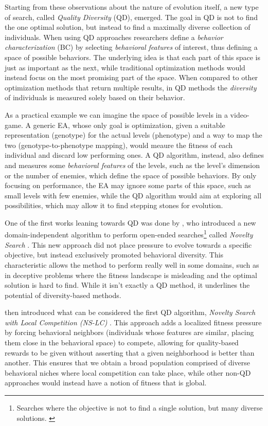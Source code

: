 \documentclass{Configuration_Files/PoliMi3i_thesis}
\begin{document}
Starting from these observations about the nature of evolution itself, a new type of search, called \textit{Quality Diversity} (QD), emerged. The goal in QD is not to find the one optimal solution, but instead to find a maximally diverse collection of individuals. When using QD approaches researchers define a \textit{behavior characterization} (BC) by selecting \textit{behavioral features} of interest, thus defining a space of possible behaviors. The underlying idea is that each part of this space is just as important as the next, while traditional optimization methods would instead focus on the most promising part of the space. When compared to other optimization methods that return multiple results, in QD methods the \textit{diversity} of individuals is measured solely based on their behavior. \cite{pugh_quality_2016}  

As a practical example we can imagine the space of possible levels in a video-game. A generic EA, whose only goal is optimization, given a suitable representation (genotype) for the actual levels (phenotype) and a way to map the two (genotype-to-phenotype mapping), would meaure the fitness of each individual and discard low performing ones. A QD algorithm, instead, also defines and measures some \textit{behavioral features} of the levels, such as the level's dimension or the number of enemies, which define the space of possible behaviors. By only focusing on performance, the EA may ignore some parts of this space, such as small levels with few enemies, while the QD algorithm would aim at exploring all possibilities, which may allow it to find stepping stones for evolution.

One of the first works leaning towards QD was done by \citeauthor{lehman_exploiting_2008}, who introduced a new domain-independent algorithm to perform open-ended searches\footnote{Searches where the objective is not to find a single solution, but many diverse solutions. \cite{stanley_why_2019}} called \textit{Novelty Search} \cite{lehman_exploiting_2008}. This new approach did not place pressure to evolve towards a specific objective, but instead exclusively promoted behavioral diversity. This characteristic allows the method to perform really well in some domains, such as in deceptive problems where the fitness landscape is misleading and the optimal solution is hard to find. While it isn't exactly a QD method, it underlines the potential of diversity-based methods. 

 then introduced what can be considered the first QD algorithm, \textit{Novelty Search with Local Competition (NS-LC)} \cite{lehman_evolving_2011}. This approach adds a localized fitness pressure by forcing behavioral neighbors (individuals whose features are similar, placing them close in the behavioral space) to compete, allowing for quality-based rewards to be given without asserting that a given neighborhood is better than another. This ensures that we obtain a broad population comprised of diverse behavioral niches where local competition can take place, while other non-QD approaches would instead have a notion of fitness that is global. 
\end{document}
